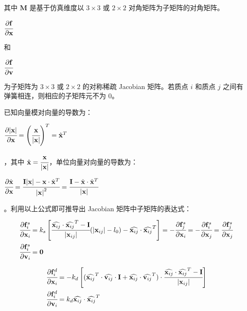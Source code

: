 \documentclass[UTF8]{ctexart}
\begin{document}
其中 $\mathbf{M}$ 是基于仿真维度以 $3 \times 3$ 或 $2 \times 2$ 对角矩阵为子矩阵的对角矩阵。\begin{large}$\cfrac{\partial \mathbf{f}}{\partial \mathbf{x}}$ \end{large}和 \begin{large} $\cfrac{\partial \mathbf{f}}{\partial \mathbf{v}}$ \end{large}为子矩阵为 $3 \times 3$ 或 $2 \times 2$ 的对称稀疏 Jacobian 矩阵。若质点 $i$ 和质点 $j$ 之间有弹簧相连，则相应的子矩阵元不为 $0$。 \par

已知向量模对向量的导数为：\begin{large}$ \cfrac{\partial \lvert \mathbf{x} \rvert}{\partial \mathbf{x}} = \left ( \cfrac{\mathbf{x}}{\lvert \mathbf{x} \rvert} \right )^T = {\hat{\mathbf{x}}}^T $\end{large}，其中 
$\hat{\mathbf{x}} = \cfrac{\mathbf{x}}{\lvert \mathbf{x} \rvert}$，单位向量对向量的导数为：\begin{large}$ \cfrac{\partial \hat{\mathbf{x}}}{\partial \mathbf{x}} = \cfrac{\mathbf{I} \lvert \mathbf{x} \rvert - \mathbf{x} \cdot {\hat{\mathbf{x}}}^T}{{\lvert \mathbf{x} \rvert}^2} = \cfrac{\mathbf{I} - \hat{\mathbf{x}} \cdot {\hat{\mathbf{x}}}^T}{\lvert \mathbf{x} \rvert}$ \end{large}。利用以上公式即可推导出 Jacobian 矩阵中子矩阵的表达式：\par

\begin{large}
\begin{equation}
\begin{split}
& \cfrac{\partial \mathbf{f}_i^s}{\partial \mathbf{x}_i} = k_s \left [ \cfrac{\widehat{\mathbf{x}_{ij}} \cdot \widehat{\mathbf{x}_{ij}}^T - \mathbf{I}}{\lvert \mathbf{x}_{ij} \rvert} (\lvert \mathbf{x}_{ij} \rvert - l_0) -  \widehat{\mathbf{x}_{ij}} \cdot \widehat{\mathbf{x}_{ij}}^T \right ] = 
- \cfrac{\partial \mathbf{f}_j^s}{\partial \mathbf{x}_i} = 
- \cfrac{\partial \mathbf{f}_i^s}{\partial \mathbf{x}_j} = 
\cfrac{\partial \mathbf{f}_j^s}{\partial \mathbf{x}_j} \\
& \cfrac{\partial \mathbf{f}_i^s}{\partial \mathbf{v}_i} = \mathbf{0}
\end{split}
\end{equation}
\end{large}

\begin{large}
\begin{equation}
\begin{split}
& \cfrac{\partial \mathbf{f}_i^d}{\partial \mathbf{x}_i} = -k_d \left[ 
(\widehat{\mathbf{x}_{ij}}^T \cdot \widehat{\mathbf{v}_{ij}} \cdot \mathbf{I} +
\widehat{\mathbf{x}_{ij}} \cdot \widehat{\mathbf{v}_{ij}}^T
) \cdot
\cfrac{\widehat{\mathbf{x}_{ij}} \cdot \widehat{\mathbf{x}_{ij}}^T - \mathbf{I}}{\lvert \mathbf{x}_{ij} \rvert}
\right] \\
& \cfrac{\partial \mathbf{f}_i^d}{\partial \mathbf{v}_i} = k_d \widehat{\mathbf{x}_{ij}} \cdot \widehat{\mathbf{x}_{ij}}^T
\end{split}
\end{equation}
\end{large}
\end{document}
